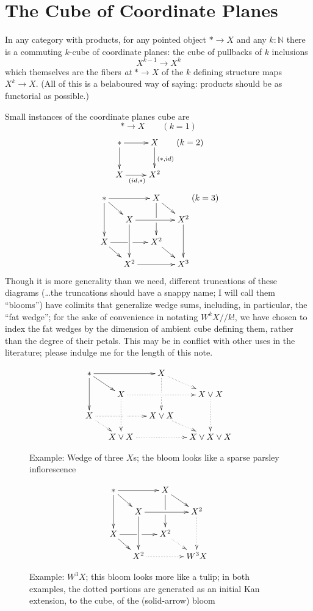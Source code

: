 \documentclass{article}
\newcommand{\NN}{\mathbb{N}}
\newcommand{\6}{\partial}
\newcommand{\8}{\infty}
\newcommand{\bq}{/\!/}
\newcommand{\wsm}{\vee}
\begin{document}
\section{The Cube of Coordinate Planes}
In any category with products, for any pointed object $* \to X$ and any $k:\NN$ there is a commuting $k$-cube of coordinate planes: the cube of pullbacks of $k$ inclusions
$$ X^{k-1} \to X^k $$ 
which themselves are the fibers {\em at} $*\to X$ of the $k$ defining structure maps $X^k \to X$.
(All of this is a belaboured way of saying: products should be as functorial as possible.)

Small instances of the coordinate planes cube are
$$ * \to X \qquad (k=1) $$
$$ \begin{xy}\xymatrix{ {*} \ar[r] \ar[d] & X \ar[d]^{(*,id)} \\
X \ar[r]_{(id,*)} & X^2 } \end{xy} (k=2) $$
$$ \begin{xy}\xymatrix@=1.2em{
 {*} \ar[rr] \ar[dr] \ar[dd] &  & X \ar[dr] \ar[dd]|\hole\\
    & X \ar[dd] \ar[rr] &  & X^2 \ar[dd] \\
 X \ar[rr]|\hole \ar[dr]   &  & X^2 \ar[dr]  \\ 
  & X^2 \ar[rr] &  & X^3 }\end{xy} (k=3) $$
Though it is more generality than we need, different truncations of these diagrams (\dots the truncations should have a snappy name; I will call them ``blooms'') have colimits that generalize wedge sums, including, in particular, the ``fat wedge''; for the sake of convenience in notating $W^k X \bq k!$, we have chosen to index the fat wedges by the dimension of ambient cube defining them, rather than the degree of their petals.  This may be in conflict with other uses in the literature; please indulge me for the length of this note.
\begin{figure}[!h]
$$ \begin{xy}\xymatrix@=1.2em{
 {*} \ar[rr] \ar[dr] \ar[dd] &  & X \ar@{..>}[dr] \ar@{..>}[dd]|\hole\\
    & X \ar@{..>}[dd] \ar@{..>}[rr] &  & X\wsm X \ar@{..>}[dd] \\
 X \ar@{..>}[rr]|\hole \ar@{..>}[dr]   &  & X\wsm X \ar@{..>}[dr]  \\ 
  & X\wsm X \ar@{..>}[rr] &  & X\wsm X\wsm X }\end{xy} $$
\caption{\small Example: Wedge of three $X$s; the bloom looks like a sparse parsley inflorescence}
\end{figure}
\begin{figure}[!h]
$$ \begin{xy}\xymatrix@=1.2em{
 {*} \ar[rr] \ar[dr] \ar[dd] &  & X \ar[dr] \ar[dd]|\hole\\
    & X \ar[dd] \ar[rr] &  & X^2 \ar@{..>}[dd] \\
 X \ar[rr]|\hole \ar[dr]   &  & X^2 \ar@{..>}[dr]  \\ 
  & X^2 \ar@{..>}[rr] &  & W^3 X }\end{xy} $$
\caption{\small Example: $W^3 X$; this bloom looks more like a tulip; in both examples, the dotted portions are generated as an initial Kan extension, to the cube, of the (solid-arrow) bloom}
\end{figure}
\end{document}
